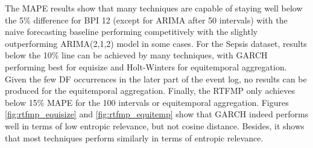 The MAPE results show that many techniques are capable of staying well below the 5\% difference for BPI 12 (except for ARIMA after 50 intervals) with the naive forecasting baseline performing competitively with the slightly outperforming ARIMA(2,1,2) model in some cases.
For the Sepsis dataset, results below the 10\% line can be achieved by many techniques, with GARCH performing best for equisize and Holt-Winters for equitemporal aggregation.
Given the few DF occurrences in the later part of the event log, no results can be produced for the equitemporal aggregation.
Finally, the RTFMP only achieves below 15\% MAPE for the 100 intervals or equitemporal aggregation.
Figures \ref{fig:rtfmp_equisize} and \ref{fig:rtfmp_equitemp} show that GARCH indeed performs well in terms of low entropic relevance, but not cosine distance.
Besides, it shows that most techniques perform similarly in terms of entropic relevance.


